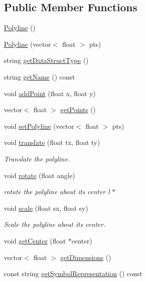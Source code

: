 \subsection*{Public Member Functions}
\begin{DoxyCompactItemize}
\item 
\hyperlink{classbridges_1_1datastructure_1_1_polyline_a488f6612485fc66534035c3574281a11}{Polyline} ()
\item 
\hyperlink{classbridges_1_1datastructure_1_1_polyline_aceb69c3294ab4c16b2931e1073d3f996}{Polyline} (vector$<$ float $>$ pts)
\item 
string \hyperlink{classbridges_1_1datastructure_1_1_polyline_a49b37ad55cf64fe759ee5a0f46e2e0cc}{get\+Data\+Struct\+Type} ()
\item 
string \hyperlink{classbridges_1_1datastructure_1_1_polyline_a46f2830cd85a09e9c4d62d54110dbe13}{get\+Name} () const
\item 
void \hyperlink{classbridges_1_1datastructure_1_1_polyline_a00698223911f07cafca29ec80c507678}{add\+Point} (float x, float y)
\item 
vector$<$ float $>$ \hyperlink{classbridges_1_1datastructure_1_1_polyline_a634034b6874af45e2b8c56d70e8725c5}{get\+Points} ()
\item 
void \hyperlink{classbridges_1_1datastructure_1_1_polyline_ab1fb850dabd3ed58fd4f916992a0b9a6}{set\+Polyline} (vector$<$ float $>$ pts)
\item 
void \hyperlink{classbridges_1_1datastructure_1_1_polyline_a0b651b1c383b228f8d473232e64e4bda}{translate} (float tx, float ty)
\begin{DoxyCompactList}\small\item\em Translate the polyline. \end{DoxyCompactList}\item 
void \hyperlink{classbridges_1_1datastructure_1_1_polyline_aa61978ccbb0b086dc8f55e90ccca23c9}{rotate} (float angle)
\begin{DoxyCompactList}\small\item\em rotate the polyline about its center l $\ast$ \end{DoxyCompactList}\item 
void \hyperlink{classbridges_1_1datastructure_1_1_polyline_adf06f484d9a48960de84ed3646903f3a}{scale} (float sx, float sy)
\begin{DoxyCompactList}\small\item\em Scale the polyline about its center. \end{DoxyCompactList}\item 
void \hyperlink{classbridges_1_1datastructure_1_1_polyline_ad0783deb77873eda19528681bbbca25c}{get\+Center} (float $\ast$center)
\item 
vector$<$ float $>$ \hyperlink{classbridges_1_1datastructure_1_1_polyline_aebcd7f4f80e2eed35057e5b1d82ba4e7}{get\+Dimensions} ()
\item 
const string \hyperlink{classbridges_1_1datastructure_1_1_polyline_a176c06400a3b105fa651c69891381201}{get\+Symbol\+Representation} () const
\end{DoxyCompactItemize}
